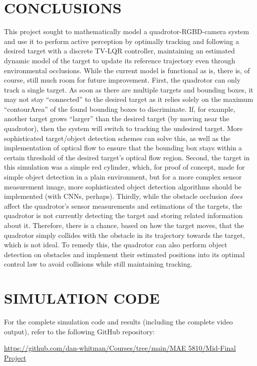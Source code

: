 \documentclass[11pt]{article}
\newcommand{\appendixpagenumbering}{\clearpage\pagenumbering{arabic}\renewcommand{\thepage}{A-\arabic{page}}}
\begin{document}
\section{CONCLUSIONS}\label{sec:conclusion}
This project sought to mathematically model a quadrotor-RGBD-camera system and use it to perform active perception by optimally tracking and following a desired target with a discrete TV-LQR controller, maintaining an estimated dynamic model of the target to update its reference trajectory even through environmental occlusions. While the current model is functional as is, there is, of course, still much room for future improvement. First, the quadrotor can only track a single target. As soon as there are multiple targets and bounding boxes, it may not stay ``connected'' to the desired target as it relies solely on the maximum ``contourArea'' of the found bounding boxes to discriminate. If, for example, another target grows ``larger'' than the desired target (by moving near the quadrotor), then the system will switch to tracking the undesired target. More sophisticated target/object detection schemes can solve this, as well as the implementation of optical flow to ensure that the bounding box stays within a certain threshold of the desired target's optical flow region. Second, the target in this simulation was a simple red cylinder, which, for proof of concept, made for simple object detection in a plain environment, but for a more complex sensor measurement image, more sophisticated object detection algorithms should be implemented (with CNNs, perhaps). Thirdly, while the obstacle occlusion \textit{does} affect the quadrotor's sensor measurements and estimations of the targets, the quadrotor is not currently detecting the target and storing related information about it. Therefore, there is a chance, based on how the target moves, that the quadrotor simply collides with the obstacle in its trajectory towards the target, which is not ideal. To remedy this, the quadrotor can also perform object detection on obstacles and implement their estimated positions into its optimal control law to avoid collisions while still maintaining tracking. 

\clearpage
\printbibliography[title={\textbf{REFERENCES}}]

\appendix\appendixpagenumbering
\section{SIMULATION CODE}\label{app:code}
For the complete simulation code and results (including the complete video output), refer to the following GitHub repository:

\href{https://github.com/dan-whitman/Courses/tree/main/MAE%205810/Mid-Final%20Project}{https://github.com/dan-whitman/Courses/tree/main/MAE 5810/Mid-Final Project}
\end{document}
